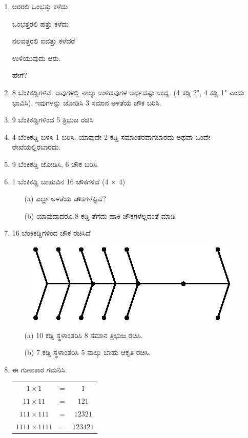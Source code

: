 \begin{enumerate}
\item ಆರರಲಿ ಒಂಭತ್ತು ಕಳೆದು 

ಒಂಭತ್ತರಲಿ ಹತ್ತು ಕಳೆದು 

ನಲವತ್ತರಲಿ ಐವತ್ತು ಕಳೆದರೆ 

ಉಳಿಯುವುದು ಆರು.

ಹೇಗೆ?

\item 8 ಬೆಂಕಿಕಡ್ಡಿಗಳಿವೆ. ಅವುಗಳಲ್ಲಿ ನಾಲ್ಕು ಉಳಿದವುಗಳ ಅರ್ಧದಷ್ಟು ಉದ್ದ. (4 ಕಡ್ಡಿ  2", 4 ಕಡ್ಡಿ 1" ಎಂದು ಭಾವಿಸಿ). ಇವುಗಳನ್ನು ಜೋಡಿಸಿ 3 ಸಮಾನ ಅಳತೆಯ ಚೌಕ ಬರಿಸಿ. 

\item 9 ಬೆಂಕಿಕಡ್ಡಿಗಳಿಂದ 5 ತ್ರಿಭುಜ ರಚಿಸಿ 

\item 4 ಬೆಂಕಿಕಡ್ಡಿ ಬಳಸಿ 1 ಬರಿಸಿ. ಯಾವುದೇ 2 ಕಡ್ಡಿ ಸಮಾಂತರವಾಗಬಾರದು ಅಥವಾ ಒಂದೇ ರೇಖೆಯಲ್ಲಿರಬಾರದು.

\item 9 ಬೆಂಕಿಕಡ್ಡಿ ಜೋಡಿಸಿ, 6 ಚೌಕ ಬರಿಸಿ.

\item 1 ಬೆಂಕಿಕಡ್ಡಿ ಬಾಹುವಿನ 16 ಚೌಕಗಳಿವೆ (4 $\times$ 4)
\begin{itemize}
\item[(a)] ಎಲ್ಲಾ ಅಳತೆಯ ಚೌಕಗಳೆಷ್ಟಿವೆ? 
\item[(b)] ಯಾವುದಾದರೂ 8 ಕಡ್ಡಿ ತೆಗೆದು ಹಾಕಿ ಚೌಕಗಳೆಲ್ಲದಂತೆ ಮಾಡಿ 
\end{itemize}

\item 16 ಬೆಂಕಿಕಡ್ಡಿಗಳಿಂದ ಚೌಕ ರಚಿಸಿದೆ 
\begin{figure}[H]
\centering
\includegraphics{images/chap4/q18.eps}
\end{figure}
\begin{itemize}
\item[(a)] 10 ಕಡ್ಡಿ ಸ್ಥಳಾಂತರಿಸಿ 8 ಸಮಾನ ತ್ರಿಭುಜ ರಚಿಸಿ.
\item[(b)] 7 ಕಡ್ಡಿ ಸ್ಥಳಾಂತರಿಸಿ 5 ನಾಲ್ಕು ಬಾಹು ಆಕೃತಿ ರಚಿಸಿ.
\end{itemize}

\item ಈ ಗುಣಾಕಾರ ಗಮನಿಸಿ.

\begin{tabular}{ccc}
$1 \times 1$ & = & $1$\\
$11 \times 11$ & = & $121$\\
$111 \times 111$ & = & $12321$\\
$1111 \times 1111$ & = & $123421$
\end{tabular}


\end{enumerate}
